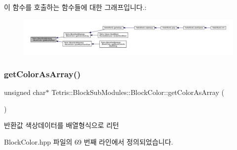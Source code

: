 이 함수를 호출하는 함수들에 대한 그래프입니다.\+:
\nopagebreak
\begin{figure}[H]
\begin{center}
\leavevmode
\includegraphics[width=350pt]{class_tetris_1_1_block_sub_modules_1_1_block_color_ac0ad44a8b001f3824447d137357f5145_icgraph}
\end{center}
\end{figure}
\mbox{\label{class_tetris_1_1_block_sub_modules_1_1_block_color_ac626961ee3894d89a7fc961e9f40c92f}} 
\subsubsection{\texorpdfstring{get\+Color\+As\+Array()}{getColorAsArray()}}
{\footnotesize\ttfamily unsigned char$\ast$ Tetris\+::\+Block\+Sub\+Modules\+::\+Block\+Color\+::get\+Color\+As\+Array (\begin{DoxyParamCaption}{ }\end{DoxyParamCaption})\hspace{0.3cm}{\ttfamily [inline]}}

\begin{DoxyReturn}{반환값}
색상데이터를 배열형식으로 리턴 
\end{DoxyReturn}


Block\+Color.\+hpp 파일의 69 번째 라인에서 정의되었습니다.

